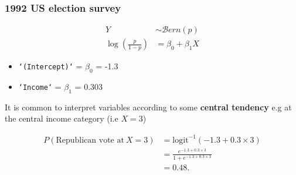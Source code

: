 \documentclass[pdf]{beamer}
\begin{document}
\begin{frame}[fragile]
\frametitle{1992 US election survey}

$$
\begin{aligned}
Y  & \sim \mathcal{B}ern(p)\\
\log\left(\frac{p}{1 - p}\right) &  = \beta_0 + \beta_1 X
\end{aligned}
$$

\begin{itemize}
\item \texttt{`(Intercept)`} = $\beta_0$ = -1.3
\item \texttt{`Income`} = $\beta_1$ = 0.303
\end{itemize}

It is common to interpret variables according to some \textbf{central tendency} e.g at
the central income category (i.e $X=3$)

$$
\begin{aligned}
P(\mbox{Republican vote at}~X = 3) &= \mbox{logit}^{-1}\left(-1.3 + 0.3 \times 3\right)\\
&= \frac{e^{-1.3 + 0.3 \times 3}}{1 + e^{-1.3 + 0.3 \times 3}}\\
&= 0.48.
\end{aligned}
$$

\end{frame}


\end{document}
